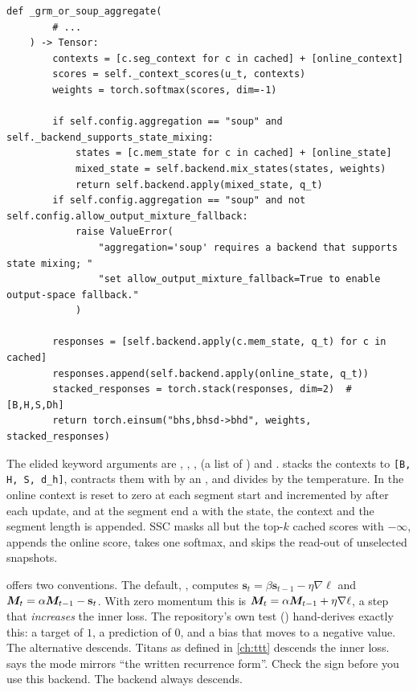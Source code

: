 \begin{lstlisting}[caption={Excerpt from \texttt{repos/kmccleary3301\_\_memory\_caching/src/memory\_caching/layer.py}},label={lst:c13-mc-grm}]
    def _grm_or_soup_aggregate(
        # ...
    ) -> Tensor:
        contexts = [c.seg_context for c in cached] + [online_context]
        scores = self._context_scores(u_t, contexts)
        weights = torch.softmax(scores, dim=-1)

        if self.config.aggregation == "soup" and self._backend_supports_state_mixing:
            states = [c.mem_state for c in cached] + [online_state]
            mixed_state = self.backend.mix_states(states, weights)
            return self.backend.apply(mixed_state, q_t)
        if self.config.aggregation == "soup" and not self.config.allow_output_mixture_fallback:
            raise ValueError(
                "aggregation='soup' requires a backend that supports state mixing; "
                "set allow_output_mixture_fallback=True to enable output-space fallback."
            )

        responses = [self.backend.apply(c.mem_state, q_t) for c in cached]
        responses.append(self.backend.apply(online_state, q_t))
        stacked_responses = torch.stack(responses, dim=2)  # [B,H,S,Dh]
        return torch.einsum("bhs,bhsd->bhd", weights, stacked_responses)
\end{lstlisting}

The elided keyword arguments are , , ,  (a list of
) and .  stacks the contexts to
\texttt{[B, H, S, d\_h]}, contracts them with  by an , and divides by the temperature.
In  the online context is reset to zero at each segment start and incremented by
 after each update, and at the segment end a  with the state, the context and
the segment length is appended. SSC
masks all but the top-$k$ cached scores with $-\infty$, appends the online score, takes one softmax, and
skips the read-out of unselected snapshots.

\begin{pitfall}[title={Sign conventions in the \texttt{titans} backend}]
 offers two conventions. The default, , computes
$\mathbf{s}_t=\beta\mathbf{s}_{t-1}-\eta\nabla\ell$ and $\bm{M}_t=\alpha\bm{M}_{t-1}-\mathbf{s}_t$. With zero momentum this is
$\bm{M}_t=\alpha\bm{M}_{t-1}+\eta\nabla\ell$, a step that \emph{increases} the inner loss. The repository's own test
() hand-derives exactly
this: a target of $1$, a prediction of $0$, and a bias that moves to a negative value. The alternative
 descends. Titans as defined in \cref{ch:ttt} descends the inner loss.
 says the  mode mirrors ``the written recurrence form''. Check the
sign before you use this backend. The  backend always descends.
\end{pitfall}

